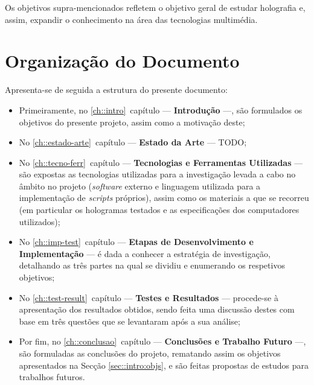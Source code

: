 Os objetivos supra-mencionados refletem o objetivo geral de estudar holografia e, assim, expandir o conhecimento na área das tecnologias multimédia.


\section{Organização do Documento}
\label{sec::intro:organiza}

Apresenta-se de seguida a estrutura do presente documento:

\begin{itemize}
  \item Primeiramente, no \ref{ch::intro}\textordmasculine~capítulo --- \textbf{Introdução} ---, são formulados os objetivos do presente projeto, assim como a motivação deste;

  \item No \ref{ch::estado-arte}\textordmasculine~capítulo --- \textbf{Estado da Arte} --- TODO;

  \item No \ref{ch::tecno-ferr}\textordmasculine~capítulo --- \textbf{Tecnologias e Ferramentas Utilizadas} --- são expostas as tecnologias utilizadas para a investigação levada a cabo no âmbito no projeto (\textit{software} externo e linguagem utilizada para a implementação de \textit{scripts} próprios), assim como os materiais a que se recorreu (em particular os hologramas testados e as especificações dos computadores utilizados);

  \item No \ref{ch::imp-test}\textordmasculine~capítulo --- \textbf{Etapas de Desenvolvimento e Implementação} --- é dada a conhecer a estratégia de investigação, detalhando as três partes na qual se dividiu e enumerando os respetivos objetivos;

  \item No \ref{ch::test-result}\textordmasculine~capítulo --- \textbf{Testes e Resultados} --- procede-se à apresentação dos resultados obtidos, sendo feita uma discussão destes com base em três questões que se levantaram após a sua análise;

  \item Por fim, no \ref{ch::conclusao}\textordmasculine~capítulo --- \textbf{Conclusões e Trabalho Futuro} ---, são formuladas as conclusões do projeto, rematando assim os objetivos apresentados na Secção \ref{sec::intro:objs}, e são feitas propostas de estudos para trabalhos futuros.
\end{itemize}

